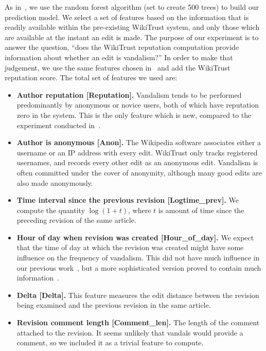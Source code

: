 As in~\cite{Adler2011a}, we use the random forest algorithm (set to
create 500 trees) to build our prediction model.
We select a set of features based on the information that is readily
available within the pre-existing WikiTrust system, and only those which
are available at the instant an edit is made.
The purpose of our experiment is to answer the question,
``does the WikiTrust reputation computation provide information about
whether an edit is vandalism?''
In order to make that judgement, we use the same features chosen
in~\cite{Adler2010b} and add the WikiTrust reputation score.
The total set of features we used are:
%
\begin{itemize}

\item \textbf{Author reputation [Reputation].}
Vandalism tends to be performed
predominantly by anonymous or novice users, both of which have
reputation zero in the system.
This is the only feature which is new, compared to the experiment
conducted in~\cite{Adler2010b}.

\item \textbf{Author is anonymous [Anon].}
The Wikipedia software associates either a username or an IP address
with every edit.
WikiTrust only tracks registered usernames, and records every other edit
as an anonymous edit.
Vandalism is often committed under the cover of anonymity, although many
good edits are also made anonymously.

\item \textbf{Time interval since the previous revision [Logtime\_prev].}
We compute the quantity $\log(1 + t)$, where $t$ is amount of time since
the preceding revision of the same article.


\item \textbf{Hour of day when revision was created [Hour\_of\_day].}
We expect that the time of day at which the revision was created
might have some influence on the frequency of vandalism.
This did not have much influence in our previous work~\cite{Adler2010b},
but a more sophisticated version proved to contain much
information~\cite{West2010}.

\item \textbf{Delta [Delta].}
This feature measures the edit distance  between the
revision being examined and the previous revision in the same article.

\item \textbf{Revision comment length [Comment\_len].}
The length of the comment attached to the revision.
It seems unlikely that vandals would provide a comment,
so we included it as a trivial feature to compute.


\end{itemize}

